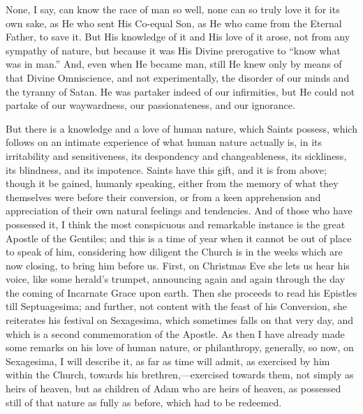 None, I say, can know the race of man so well, none
can so truly love it for its own sake, as He who sent His
Co-equal Son, as He who came from the Eternal Father, to
save it. But His knowledge of it and His love of it
arose, not from any sympathy of nature, but because it
was His Divine prerogative to ``know what was in
man.'' And, even when He became man, still He knew
only by means of that Divine Omniscience, and not
experimentally, the disorder of our minds and the tyranny
of Satan. He was partaker indeed of our infirmities, but
He could not partake of our waywardness, our
passionateness, and our ignorance.

But there is a knowledge and a love of human nature,
which Saints possess, which follows on an intimate
experience of what human nature actually is, in its
irritability and sensitiveness, its despondency and
changeableness, its sickliness, its blindness, and its
impotence. Saints have this gift, and it is from above;
though it be gained, humanly speaking, either from the
memory of what they themselves were before their
conversion, or from a keen apprehension and appreciation
of their own natural feelings and tendencies. And of
those who have possessed it, I think the most conspicuous
and remarkable instance is the great Apostle of the
Gentiles; and this is a time of year when it cannot be
out of place to speak of him, considering how diligent
the Church is in the weeks which are now closing, to
bring him before us. First, on Christmas Eve she lets us
hear his voice, like some herald's trumpet, announcing
again and again through the day the coming of Incarnate
Grace upon earth. Then she proceeds to read his Epistles
till Septuagesima; and further, not content with the
feast of his Conversion, she reiterates his festival on
Sexagesima, which sometimes falls on that very day, and
which is a second commemoration of the Apostle. As then I
have already made some remarks on his love of human
nature, or philanthropy, generally, so now, on
Sexagesima, I will describe it, as far as time will
admit, as exercised by him within the Church, towards his
brethren,—exercised towards them, not simply as
heirs of heaven, but as children of Adam who are heirs of
heaven, as possessed still of that nature as fully as
before, which had to be redeemed.

